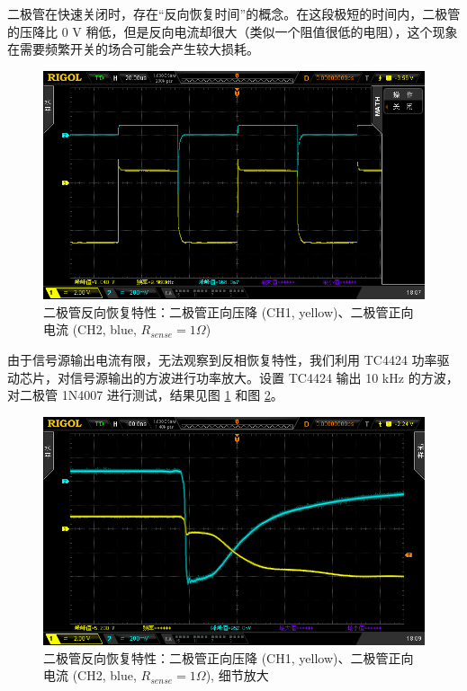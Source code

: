\documentclass[UTF8]{article}
\begin{document}
二极管在快速关闭时，存在“反向恢复时间”的概念。在这段极短的时间内，二极管的压降比 0 V 稍低，但是反向电流却很大（类似一个阻值很低的电阻），这个现象在需要频繁开关的场合可能会产生较大损耗。


\begin{figure}[H]\centering
    \includegraphics[width=\columnwidth]{LCE-01-二极管/assets/二极管反相恢复特性/二极管反相恢复特性 1Ohm电阻 1N4007 10KHz.png}
    \caption{二极管反向恢复特性：二极管正向压降 (CH1, yellow)、二极管正向电流 (CH2, blue, $R_{sense} = 1 \Omega$)}
    \label{fig: 二极管反向恢复特性}
\end{figure}

由于信号源输出电流有限，无法观察到反相恢复特性，我们利用 TC4424 功率驱动芯片，对信号源输出的方波进行功率放大。设置 TC4424 输出 10 kHz 的方波，对二极管 1N4007 进行测试，结果见图 \ref{fig: 二极管反向恢复特性} 和图 \ref{fig: 二极管反向恢复特性 细节放大}。

\begin{figure}[H]\centering
    \includegraphics[width=\columnwidth]{LCE-01-二极管/assets/二极管反相恢复特性/二极管反相恢复特性-细节放大 1Ohm电阻 1N4007 10KHz.png}
    \caption{二极管反向恢复特性：二极管正向压降 (CH1, yellow)、二极管正向电流 (CH2, blue, $R_{sense} = 1 \Omega$), 细节放大}
    \label{fig: 二极管反向恢复特性 细节放大}
\end{figure}
\end{document}

